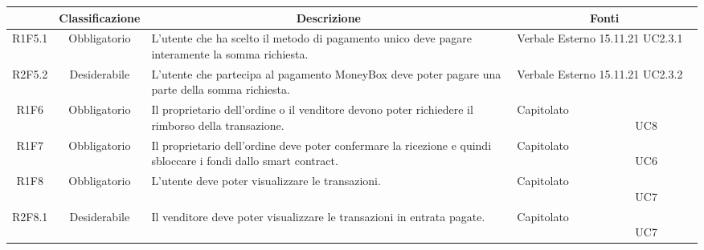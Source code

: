 \begin{table}[H]
    \centering
    \renewcommand{\arraystretch}{1.8}
    \begin{tabular}{c | c | p{6cm} | p{4.1cm}}
        \rowcolor[HTML]{125E28}
        \multicolumn{1}{c}{\color[HTML]{FFFFFF} \textbf{Codice}}          &
        \multicolumn{1}{c}{\color[HTML]{FFFFFF} \textbf{Classificazione}} &
        \multicolumn{1}{c}{\color[HTML]{FFFFFF} \textbf{Descrizione}}     &
        \multicolumn{1}{c}{\color[HTML]{FFFFFF} \textbf{Fonti}}                                                                                                                                                                                                             \\
        \hline
        R1F5.1                                                            & Obbligatorio & L'utente che ha scelto il metodo di pagamento unico deve pagare interamente la somma richiesta.                       & Verbale Esterno 15.11.21 UC2.3.1                         \\
        R2F5.2                                                            & Desiderabile & L'utente che partecipa al pagamento MoneyBox\glo{} deve poter pagare una parte della somma richiesta.                 & Verbale Esterno 15.11.21 UC2.3.2                         \\
        R1F6                                                              & Obbligatorio & Il proprietario dell'ordine o il venditore devono poter richiedere il rimborso della transazione.                     & Capitolato \ \ \ \ \ \ \ \ \ \ \ \ \ \ \ \ \ \ \ \ \ UC8 \\
        R1F7                                                              & Obbligatorio & Il proprietario dell'ordine deve poter confermare la ricezione e quindi sbloccare i fondi dallo smart contract\glo{}. & Capitolato \ \ \ \ \ \ \ \ \ \ \ \ \ \ \ \ \ \ \ \ \ UC6 \\
        R1F8                                                              & Obbligatorio & L'utente deve poter visualizzare le transazioni.                                                                      & Capitolato \ \ \ \ \ \ \ \ \ \ \ \ \ \ \ \ \ \ \ \ \ UC7 \\
        R2F8.1                                                            & Desiderabile & Il venditore deve poter visualizzare le transazioni in entrata pagate.                                                & Capitolato \ \ \ \ \ \ \ \ \ \ \ \ \ \ \ \ \ \ \ \ \ UC7 \\

\end{tabular}
\end{table}
